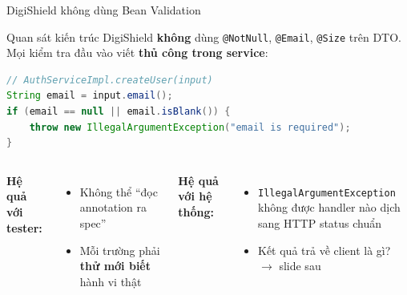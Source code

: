 \documentclass[aspectratio=169,12pt]{beamer}
\begin{document}
\begin{frame}[fragile,shrink=12]{DigiShield không dùng Bean Validation}
  \begin{block}{Quan sát kiến trúc}
    DigiShield \textbf{không} dùng \texttt{@NotNull}, \texttt{@Email},
    \texttt{@Size} trên DTO. Mọi kiểm tra đầu vào viết \textbf{thủ công
    trong service}:
  \end{block}

\begin{lstlisting}[language=java]
// AuthServiceImpl.createUser(input)
String email = input.email();
if (email == null || email.isBlank()) {
    throw new IllegalArgumentException("email is required");
}
\end{lstlisting}

  \begin{columns}[T]
    {\small\textbf{Hệ quả với tester:}
    \begin{itemize}
      \item Không thể ``đọc annotation ra spec''
      \item Mỗi trường phải \textbf{thử mới biết} hành vi thật
    \end{itemize}}
    {\small\textbf{Hệ quả với hệ thống:}
    \begin{itemize}
      \item \texttt{IllegalArgumentException} không được handler nào dịch
        sang HTTP status chuẩn
      \item Kết quả trả về client là gì? $\to$ slide sau
    \end{itemize}}
  \end{columns}
\end{frame}
\end{document}
